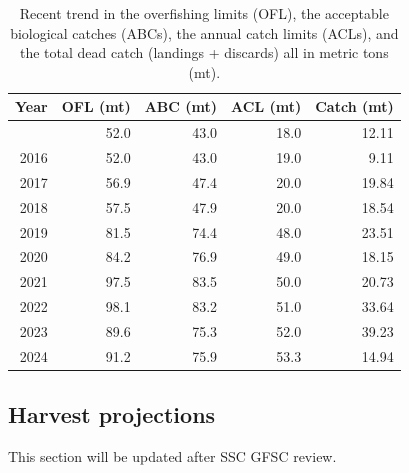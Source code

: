 \documentclass[
]{scrartcl}
\begin{document}
\begin{longtable}{rrrrr}

\caption{\label{tbl-es-management}Recent trend in the overfishing limits
(OFL), the acceptable biological catches (ABCs), the annual catch limits
(ACLs), and the total dead catch (landings + discards) all in metric
tons (mt).}

\tabularnewline

\toprule
Year & OFL (mt) & ABC (mt) & ACL (mt) & Catch (mt) \\ 
\midrule\addlinespace[2.5pt]
2015 & 52.0 & 43.0 & 18.0 & 12.11 \\ 
2016 & 52.0 & 43.0 & 19.0 & 9.11 \\ 
2017 & 56.9 & 47.4 & 20.0 & 19.84 \\ 
2018 & 57.5 & 47.9 & 20.0 & 18.54 \\ 
2019 & 81.5 & 74.4 & 48.0 & 23.51 \\ 
2020 & 84.2 & 76.9 & 49.0 & 18.15 \\ 
2021 & 97.5 & 83.5 & 50.0 & 20.73 \\ 
2022 & 98.1 & 83.2 & 51.0 & 33.64 \\ 
2023 & 89.6 & 75.3 & 52.0 & 39.23 \\ 
2024 & 91.2 & 75.9 & 53.3 & 14.94 \\ 
\bottomrule

\end{longtable}

\endgroup

\subsection*{Harvest projections}\label{harvest-projections}

This section will be updated after SSC GFSC review.

\clearpage
\end{document}
